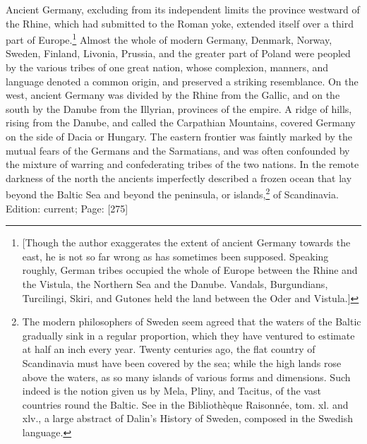 Ancient Germany, excluding from its independent limits the province westward of the Rhine, which had submitted to the Roman yoke, extended itself over a third part of Europe.\footnote{[Though the author exaggerates the extent of ancient Germany towards the east, he is not so far wrong as has sometimes been supposed. Speaking roughly, German tribes occupied the whole of Europe between the Rhine and the Vistula, the Northern Sea and the Danube. Vandals, Burgundians, Turcilingi, Skiri, and Gutones held the land between the Oder and Vistula.]} Almost the whole of modern Germany, Denmark, Norway, Sweden, Finland, Livonia, Prussia, and the greater part of Poland were peopled by the various tribes of one great nation, whose complexion, manners, and language denoted a common origin, and preserved a striking resemblance. On the west, ancient Germany was divided by the Rhine from the Gallic, and on the south by the Danube from the Illyrian, provinces of the empire. A ridge of hills, rising from the Danube, and called the Carpathian Mountains, covered Germany on the side of Dacia or Hungary. The eastern frontier was faintly marked by the mutual fears of the Germans and the Sarmatians, and was often confounded by the mixture of warring and confederating tribes of the two nations. In the remote darkness of the north the ancients imperfectly described a frozen ocean that lay beyond the Baltic Sea and beyond the peninsula, or islands,\footnote{The modern philosophers of Sweden seem agreed that the waters of the Baltic gradually sink in a regular proportion, which they have ventured to estimate at half an inch every year. Twenty centuries ago, the flat country of Scandinavia must have been covered by the sea; while the high lands rose above the waters, as so many islands of various forms and dimensions. Such indeed is the notion given us by Mela, Pliny, and Tacitus, of the vast countries round the Baltic. See in the Bibliothèque Raisonnée, tom. xl. and xlv., a large abstract of Dalin\texthebrew{}’s History of Sweden, composed in the Swedish language.} of Scandinavia.
Edition: current; Page: [275]

